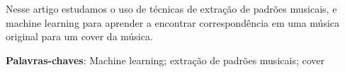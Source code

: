 
\par

\begin{resumo}

Nesse artigo estudamos o uso de técnicas de extração de padrões musicais, e machine learning para aprender a encontrar correspondência em uma música original para um cover da música.
	
\vspace{\onelineskip} 
	
\noindent

\textbf{Palavras-chaves}: Machine learning; extração de padrões musicais; cover

\end{resumo}





